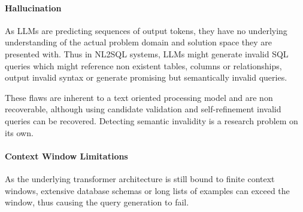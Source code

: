 \paragraph{Hallucination}

As LLMs are predicting sequences of output tokens, they have no underlying
understanding of the actual problem domain and solution space they are
presented with. Thus in NL2SQL systems, LLMs might generate invalid SQL queries
which might reference non existent tables, columns or relationships, output
invalid syntax or generate promising but semantically invalid queries.

These flaws are inherent to a text oriented processing model and are non
recoverable, although using candidate validation and self-refinement invalid
queries can be recovered. Detecting semantic invalidity is a research problem
on its own.

\paragraph{Context Window Limitations}

As the underlying transformer architecture is still bound to finite context
windows, extensive database schemas or long lists of examples can exceed the
window, thus causing the query generation to fail.
